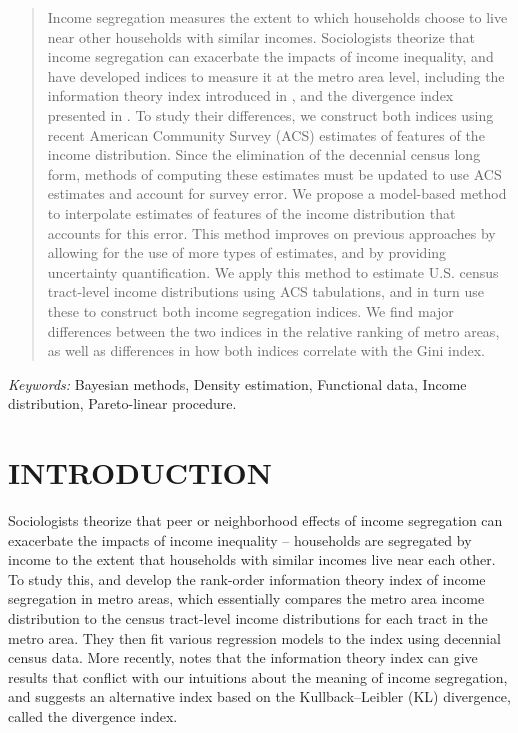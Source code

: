 \documentclass[12pt]{article}
\begin{document}
\newpage
\begin{abstract}
Income segregation measures the extent to which households choose to live near other households with similar incomes. Sociologists theorize that income segregation can exacerbate the impacts of income inequality, and have developed indices to measure it at the metro area level, including the information theory index introduced in \citet{reardon2011income}, and the divergence index presented in \citet{roberto2015divergence}. To study their differences, we construct both indices using recent American Community Survey (ACS) estimates of features of the income distribution. Since the elimination of the decennial census long form, methods of computing these estimates must be updated to use ACS estimates and account for survey error. We propose a model-based method to interpolate estimates of features of the income distribution that accounts for this error. This method improves on previous approaches by allowing for the use of more types of estimates, and by providing uncertainty quantification. We apply this method to estimate U.S. census tract-level income distributions using ACS tabulations, and in turn use these to construct both income segregation indices. We find major differences between the two indices in the relative ranking of metro areas, as well as differences in how both indices correlate with the Gini index.
\end{abstract}

\noindent%
{\it Keywords:}  Bayesian methods, Density estimation, Functional data, Income distribution, Pareto-linear procedure. 
\vfill

\newpage
{} %

\section{INTRODUCTION}\label{sec:intro}
Sociologists theorize that peer or neighborhood effects of income segregation can exacerbate the impacts of income inequality \citep[][and references therein]{reardon2011income} -- households are segregated by income to the extent that households with similar incomes live near each other. To study this, \citet{reardon2011measures} and \citet{reardon2011income} develop the rank-order information theory index of income segregation in metro areas, which essentially compares the metro area income distribution to the census tract-level income distributions for each tract in the metro area. They then fit various regression models to the index using decennial census data. More recently, \citet{roberto2015divergence} notes that the information theory index can give results that conflict with our intuitions about the meaning of income segregation, and suggests an alternative index based on the Kullback–Leibler (KL) divergence, called the divergence index.
\end{document}
